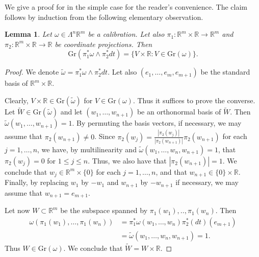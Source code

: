 \documentclass[a4paper,leqno,11pt]{amsart}
\numberwithin{equation}{section}
\newtheorem{lemma}[theorem]{Lemma}
\theoremstyle{remark}
\theoremstyle{remark}
\newcommand{\R}{\mathbb{R}}
\newcommand{\Gr}{\mathrm{Gr}}
\begin{document}
We give a proof for \cite[1.8.4]{Fed:69} in the simple case for the reader's convenience. The claim follows by induction from the following elementary observation.
\begin{lemma}
\label{lemma:Grassmannian}
Let $\omega \in \Lambda^n\R^m$ be a calibration. Let also $\pi_1 \colon \R^m \times \R\to \R^m$ and $\pi_2 \colon \R^m \times \R \to \R$ be coordinate projections. Then
\[
\Gr(\pi_1^*\omega \wedge \pi_2^*dt) = \{ V \times \R  \colon V \in \Gr(\omega)\}.
\]
\end{lemma}
\begin{proof}
We denote $\widetilde \omega  =\pi_1^*\omega \wedge \pi_2^*dt$. Let also $(e_1,\ldots, e_m,e_{m+1})$ be  the standard basis of $\R^m \times \R$. 

Clearly, $V\times \R \in \Gr(\widetilde \omega)$ for $V\in \Gr(\omega)$. Thus it suffices to prove the converse. Let $\widetilde W\in \Gr(\widetilde \omega)$ and let $(w_1,\ldots, w_{n+1})$ be an orthonormal basis of $\widetilde W$. Then $\widetilde \omega(w_1,\ldots, w_{n+1}) =1$. By permuting the basis vectors, if necessary, we may assume that $\pi_2(w_{n+1})\ne 0$. Since $\pi_2(w_j) = \frac{|\pi_2(w_j)|}{|\pi_2(w_{n+1})|} \pi_2(w_{n+1})$ for each $j=1,\ldots, n$, we have, by multilinearity and $\widetilde \omega( w_1, \dots, w_{n}, w_{n+1} ) = 1$, that $\pi_2(w_j) = 0$ for $1\le j \le n$. Thus, we also have that $|\pi_2(w_{n+1})|=1$. We conclude that $w_j \in \R^m \times \{0\}$ for each $j=1,\ldots, n$, and that $w_{n+1}\in \{0\}\times \R$. Finally, by replacing $w_1$ by $-w_1$ and $w_{n+1}$ by $-w_{n+1}$ if necessary, we may assume that $w_{n+1} = e_{m+1}$.

Let now $W\subset \R^m$ be the subspace spanned by $\pi_1(w_1),.., \pi_1(w_n)$. Then 
\begin{align*}
\omega(\pi_1(w_1),\ldots, \pi_1(w_n)) &= \pi_1^*\omega(w_1,\ldots, w_n)\pi_2^*(dt)(e_{m+1}) 
\\
&= \widetilde \omega( w_1,\ldots, w_n, w_{n+1}) =1.
\end{align*}
Thus $W\in \Gr(\omega)$. We conclude that $\widetilde W = W\times \R$.
\end{proof}
\end{document}
